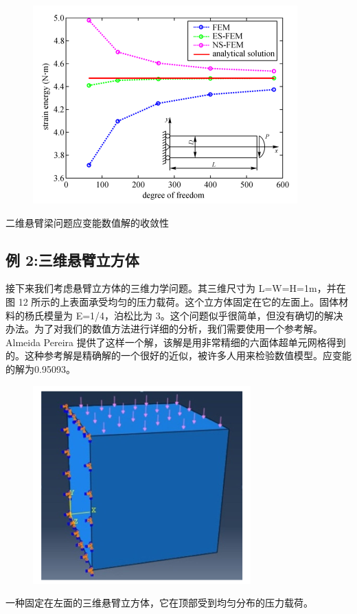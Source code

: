 \documentclass[12pt,a4paper]{article}
\begin{document}
\begin{figure}[H]
\centering
\includegraphics[scale=0.7]{./figures/15.png}
\caption{}
\end{figure}
二维悬臂梁问题应变能数值解的收敛性

\subsection{例 2:三维悬臂立方体}
接下来我们考虑悬臂立方体的三维力学问题。其三维尺寸为 L=W=H=1m，并在图 12 所示的上表面承受均匀的压力载荷。这个立方体固定在它的左面上。固体材料的杨氏模量为 E=1/4，泊松比为 3。这个问题似乎很简单，但没有确切的解决办法。为了对我们的数值方法进行详细的分析，我们需要使用一个参考解。
Almeida Pereira 提供了这样一个解，该解是用非常精细的六面体超单元网格得到的。这种参考解是精确解的一个很好的近似，被许多人用来检验数值模型。应变能的解为0.95093。

\begin{figure}[H]
\centering
\includegraphics[scale=0.6]{./figures/16.png}
\caption{}
\end{figure}
一种固定在左面的三维悬臂立方体，它在顶部受到均匀分布的压力载荷。
\end{document}
